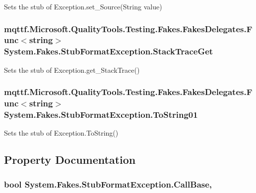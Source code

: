 Sets the stub of Exception.\-set\-\_\-\-Source(\-String value)

\hypertarget{class_system_1_1_fakes_1_1_stub_format_exception_a3f99cf98222380a4606ea64b87b36dbc}{
\subsubsection[{Stack\-Trace\-Get}]{\setlength{\rightskip}{0pt plus 5cm}mqttf.\-Microsoft.\-Quality\-Tools.\-Testing.\-Fakes.\-Fakes\-Delegates.\-Func$<$string$>$ System.\-Fakes.\-Stub\-Format\-Exception.\-Stack\-Trace\-Get}}\label{class_system_1_1_fakes_1_1_stub_format_exception_a3f99cf98222380a4606ea64b87b36dbc}


Sets the stub of Exception.\-get\-\_\-\-Stack\-Trace()

\hypertarget{class_system_1_1_fakes_1_1_stub_format_exception_aae8e5408a02db714eeefb71308cd672f}{
\subsubsection[{To\-String01}]{\setlength{\rightskip}{0pt plus 5cm}mqttf.\-Microsoft.\-Quality\-Tools.\-Testing.\-Fakes.\-Fakes\-Delegates.\-Func$<$string$>$ System.\-Fakes.\-Stub\-Format\-Exception.\-To\-String01}}\label{class_system_1_1_fakes_1_1_stub_format_exception_aae8e5408a02db714eeefb71308cd672f}


Sets the stub of Exception.\-To\-String()



\subsection{Property Documentation}
\hypertarget{class_system_1_1_fakes_1_1_stub_format_exception_ad6012c259e77996519c232a3971fa966}{
\subsubsection[{Call\-Base}]{\setlength{\rightskip}{0pt plus 5cm}bool System.\-Fakes.\-Stub\-Format\-Exception.\-Call\-Base\hspace{0.3cm}{\ttfamily [get]}, {\ttfamily [set]}}}\label{class_system_1_1_fakes_1_1_stub_format_exception_ad6012c259e77996519c232a3971fa966}


